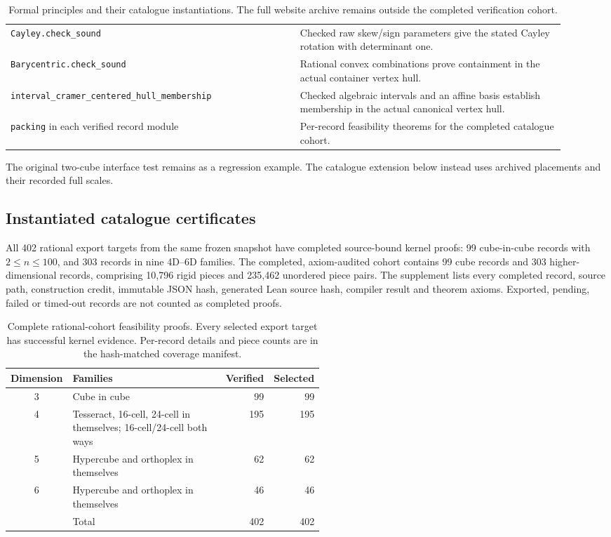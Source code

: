 \documentclass[11pt,a4paper]{article}
\newcommand{\code}[1]{\texttt{\nolinkurl{#1}}}
\newcommand{\leanRecords}{402}
\newcommand{\leanCubeRecords}{99}
\newcommand{\leanNDRecords}{303}
\newcommand{\leanFourDRecords}{195}
\newcommand{\leanFiveDRecords}{62}
\newcommand{\leanSixDRecords}{46}
\newcommand{\leanPieces}{10,796}
\newcommand{\leanPairs}{235,462}
\begin{document}
\begin{table}[htbp]
\begin{tabular}{>{\scriptsize}p{0.48\linewidth}p{0.44\linewidth}}
\code{Cayley.check_sound} & Checked raw skew/sign parameters give the stated Cayley rotation with determinant one.\\
\code{Barycentric.check_sound} & Rational convex combinations prove containment in the actual container vertex hull.\\
\code{interval_cramer_centered_hull_membership} & Checked algebraic intervals and an affine basis establish membership in the actual canonical vertex hull.\\
\code{packing} in each verified record module & Per-record feasibility theorems for the completed catalogue cohort.\\
\bottomrule
\end{tabular}
\caption{Formal principles and their catalogue instantiations. The full website archive remains outside the completed verification cohort.}
\label{tab:formal}
\end{table}

The original two-cube interface test remains as a regression example. The catalogue extension below instead uses archived placements and their recorded full scales.

\subsection{Instantiated catalogue certificates}
All 402 rational export targets from the same frozen snapshot have completed source-bound kernel proofs: 99 cube-in-cube records with $2\leq n\leq100$, and 303 records in nine 4D--6D families. The completed, axiom-audited cohort contains \leanCubeRecords{} cube records and \leanNDRecords{} higher-dimensional records, comprising \leanPieces{} rigid pieces and \leanPairs{} unordered piece pairs. The supplement lists every completed record, source path, construction credit, immutable JSON hash, generated Lean source hash, compiler result and theorem axioms. Exported, pending, failed or timed-out records are not counted as completed proofs.

\begin{table}[htbp]
\centering\small
\begin{tabular}{c>{\raggedright\arraybackslash}p{0.52\linewidth}rr}
\toprule
Dimension & Families & Verified & Selected\\
\midrule
3 & Cube in cube & \leanCubeRecords & 99\\
4 & Tesseract, 16-cell, 24-cell in themselves; 16-cell/24-cell both ways & \leanFourDRecords & 195\\
5 & Hypercube and orthoplex in themselves & \leanFiveDRecords & 62\\
6 & Hypercube and orthoplex in themselves & \leanSixDRecords & 46\\
\midrule
 & Total & \leanRecords & 402\\
\bottomrule
\end{tabular}
\caption{Complete rational-cohort feasibility proofs. Every selected export target has successful kernel evidence. Per-record details and piece counts are in the hash-matched coverage manifest.}
\label{tab:lean-coverage}
\end{table}
\end{document}
